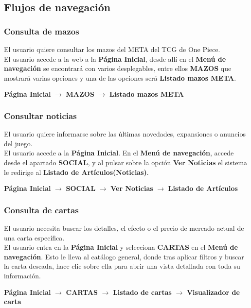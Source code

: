 \documentclass[10pt]{article}
\begin{document}
	\subsection{Flujos de navegación}
		\subsubsection{Consulta de mazos}
			El usuario quiere consultar los mazos del META del TCG de One Piece.\\
			El usuario accede a la web a la \textbf{Página Inicial}, desde allí en el \textbf{Menú de navegación} se encontrará con varios desplegables, entre ellos \textbf{MAZOS} que mostrará varias opciones y una de las opciones será \textbf{Listado mazos META}.
			\begin{center}
				\textbf{Página Inicial} $\rightarrow$ \textbf{MAZOS} $\rightarrow$ \textbf{Listado mazos META}
			\end{center}
		\subsubsection{Consultar noticias}
		El usuario quiere informarse sobre las últimas novedades, expansiones o anuncios del juego.\\
		El usuario accede a la \textbf{Página Inicial}. En el \textbf{Menú de navegación}, accede desde el apartado \textbf{SOCIAL}, y al pulsar sobre la opción \textbf{Ver Noticias} el sistema le redirige al \textbf{Listado de Artículos(Noticias)}.
		\begin{center}
			\textbf{Página Inicial} $\rightarrow$ \textbf{SOCIAL} $\rightarrow$ \textbf{Ver Noticias} $\rightarrow$ \textbf{Listado de Artículos}
		\end{center}
			
		\subsubsection{Consulta de cartas}
		El usuario necesita buscar los detalles, el efecto o el precio de mercado actual de una carta específica.\\
		El usuario entra en la \textbf{Página Inicial} y selecciona \textbf{CARTAS} en el \textbf{Menú de navegación}. Esto le lleva al catálogo general, donde tras aplicar filtros y buscar la carta deseada, hace clic sobre ella para abrir una vista detallada con toda su información.
		\begin{center}
			\textbf{Página Inicial} $\rightarrow$ \textbf{CARTAS} $\rightarrow$ \textbf{Listado de cartas} $\rightarrow$ \textbf{Visualizador de carta}
		\end{center}
		
\end{document}
